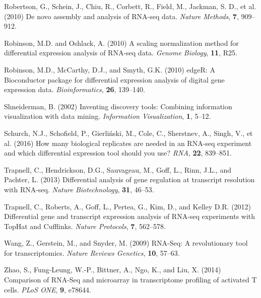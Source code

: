 \documentclass{bioinfo}
\begin{document}
\begin{thebibliography}{}
Robertson, G., Schein, J., Chiu, R., Corbett, R., Field, M., Jackman, S. D., et al. (2010) De novo assembly and analysis of RNA-seq data. {\it Nature Methods}, {\bf 7}, 909--912.

Robinson, M.D. and Oshlack, A. (2010) A scaling normalization method for differential expression analysis of RNA-seq data. {\it Genome Biology}, {\bf 11}, R25.

Robinson, M.D., McCarthy, D.J., and Smyth, G.K. (2010) edgeR: A Bioconductor package for differential expression analysis of digital gene expression data. {\it Bioinformatics}, {\bf 26}, 139--140.

Shneiderman, B. (2002) Inventing discovery tools: Combining information visualization with data mining. {\it Information Visualization}, {\bf 1}, 5--12.

Schurch, N.J., Schofield, P., Gierliński, M., Cole, C., Sherstnev, A., Singh, V., et al. (2016) How many biological replicates are needed in an RNA-seq experiment and which differential expression tool should you use? {\it RNA}, {\bf 22}, 839--851.

Trapnell, C., Hendrickson, D.G., Sauvageau, M., Goff, L., Rinn, J.L., and Pachter, L. (2013) Differential analysis of gene regulation at transcript resolution with RNA-seq. {\it Nature Biotechnology}, {\bf 31}, 46--53.

Trapnell, C., Roberts, A., Goff, L., Pertea, G., Kim, D., and Kelley D.R. (2012) Differential gene and transcript expression analysis of RNA-seq experiments with TopHat and Cufflinks. {\it Nature Protocols}, {\bf 7}, 562--578.

Wang, Z., Gerstein, M., and Snyder, M. (2009) RNA-Seq: A revolutionary tool for transcriptomics. {\it Nature Reviews Genetics}, {\bf 10}, 57--63.

Zhao, S., Fung-Leung, W.-P., Bittner, A., Ngo, K., and Liu, X. (2014) Comparison of RNA-Seq and microarray in transcriptome profiling of activated T cells. {\it PLoS ONE}, {\bf 9}, e78644.

\end{thebibliography}
\end{document}
